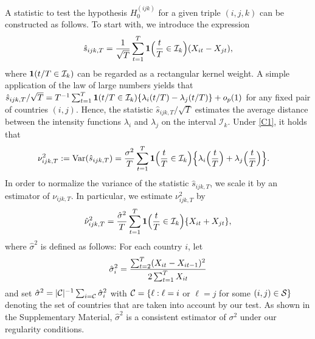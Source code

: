 \documentclass[a4paper,12pt]{article}
\numberwithin{equation}{section}
\begin{document}
A statistic to test the hypothesis $H_0^{(ijk)}$ for a given triple $(i,j,k)$ can be constructed as follows. To start with, we introduce the expression 
\[ \hat{s}_{ijk,T} = \frac{1}{\sqrt{T}} \sum\limits_{t=1}^T \boldsymbol{1}\Big(\frac{t}{T} \in \mathcal{I}_k\Big) (X_{it} - X_{jt}), \]
where $\boldsymbol{1}(t/T \in \mathcal{I}_k)$ can be regarded as a rectangular kernel weight. A simple application of the law of large numbers yields that $\hat{s}_{ijk,T}/\sqrt{T} = T^{-1} \sum_{t=1}^T \boldsymbol{1}(t/T \in \mathcal{I}_k) \{\lambda_i(t/T) - \lambda_j(t/T)\} + o_p(1)$ for any fixed pair of countries $(i,j)$. Hence, the statistic $\hat{s}_{ijk,T}/\sqrt{T}$ estimates the average distance between the intensity functions $\lambda_i$ and $\lambda_j$ on the interval $\mathcal{I}_k$. Under \ref{C1}, it holds that
\begin{align*}
\nu_{ijk,T}^2 := \textnormal{Var}(\hat{s}_{ijk,T}) 
 & = \frac{\sigma^2}{T} \sum\limits_{t=1}^T \boldsymbol{1}\Big(\frac{t}{T} \in \mathcal{I}_k\Big) \Big\{ \lambda_i\Big(\frac{t}{T}\Big) + \lambda_j\Big(\frac{t}{T}\Big) \Big\}. 
\end{align*}
In order to normalize the variance of the statistic $\hat{s}_{ijk,T}$, we scale it by an estimator of $\nu_{ijk,T}$. In particular, we estimate $\nu_{ijk,T}^2$ by 
\[ \hat{\nu}_{ijk,T}^2 = \frac{\hat{\sigma}^2}{T} \sum\limits_{t=1}^T \boldsymbol{1}\Big(\frac{t}{T} \in \mathcal{I}_k\Big) \{ X_{it} + X_{jt} \}, \]
where $\hat{\sigma}^2$ is defined as follows: For each country $i$, let 
\[ \hat{\sigma}_i^2 = \frac{\sum_{t=2}^T (X_{it}-X_{it-1})^2}{2 \sum_{t=1}^T X_{it}} \]
and set $\hat{\sigma}^2 = |\mathcal{C}|^{-1} \sum_{i=\mathcal{C}} \hat{\sigma}_i^2$ with $\mathcal{C} = \{ \ell: \ell = i$ or $\ell = j$ for some $(i,j) \in \mathcal{S} \}$ denoting the set of countries that are taken into account by our test. As shown in the Supplementary Material, $\hat{\sigma}^2$ is a consistent estimator of $\sigma^2$ under our regularity conditions. 
\end{document}
